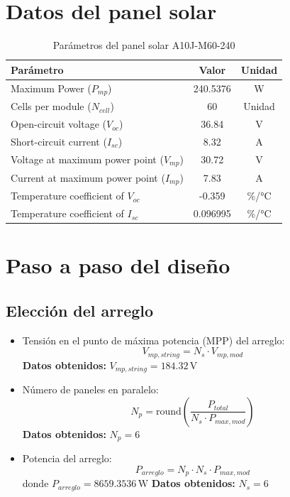 \section{Datos del panel solar}
\begin{table}[ht!]
    \centering
    \caption{Parámetros del panel solar A10J-M60-240}
    \label{tab:panel_parameters}
    \begin{tabular}{|l|c|c|}
        \hline
        \textbf{Parámetro} & \textbf{Valor} & \textbf{Unidad} \\
        \hline
        Maximum Power ($P_{mp}$) & 240.5376 & W \\
        Cells per module ($N_{cell}$) & 60 & Unidad \\
        Open-circuit voltage ($V_{oc}$) & 36.84 & V \\
        Short-circuit current ($I_{sc}$) & 8.32 & A \\
        Voltage at maximum power point ($V_{mp}$) & 30.72 & V \\
        Current at maximum power point ($I_{mp}$) & 7.83 & A \\
        Temperature coefficient of $V_{oc}$ & -0.359 & \%/°C \\
        Temperature coefficient of $I_{sc}$ & 0.096995 & \%/°C \\
        \hline
    \end{tabular}
\end{table}





\section{Paso a paso del diseño}
\subsection{Elección del arreglo}
\begin{itemize}
    \item Tensión en el punto de máxima potencia (MPP) del arreglo:
    $$V_{mp,string} = N_{s} \cdot V_{mp,mod}$$
    \textbf{Datos obtenidos:} $V_{mp,string} = 184.32 \, \text{V}$
    
    \item Número de paneles en paralelo:
    $$N_{p} = \text{round}\left(\frac{P_{total}}{N_{s} \cdot P_{max,mod}}\right)$$
    \textbf{Datos obtenidos:} $N_{p} = 6$
    
    \item Potencia del arreglo:
    $$P_{arreglo} = N_{p} \cdot N_{s} \cdot P_{max,mod}$$
    donde $P_{arreglo} = 8659.3536 \, \text{W}$
    \textbf{Datos obtenidos:} $N_{s} = 6$
\end{itemize}

